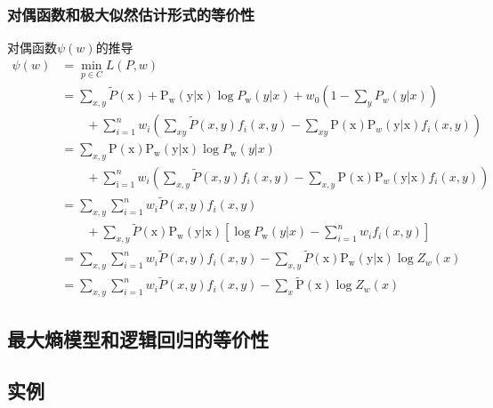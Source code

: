     \subsubsection{对偶函数和极大似然估计形式的等价性}
    对偶函数$\psi(w)$的推导%
    \begin{equation}
        \begin{aligned}
            \psi(w)&=\min _{p \in C} L(P, w) \\
            &=\sum_{x, y} \tilde{P}(\mathrm{x})+ \mathrm{P}_{\mathrm{w}}(\mathrm{y} | \mathrm{x}) \log P_{\mathrm{w}}(y | x)+w_{0}\left(1-\sum_{y} P_{w}(y | x)\right)\\
                &\qquad +\sum_{i=1}^{n} w_{i}\left(\sum_{x y} \tilde{P}(x, y) f_{i}(x, y)-\sum_{x y} \mathrm{P}(\mathrm{x}) \mathrm{P}_{w}(\mathrm{y} | \mathrm{x}) f_{i}(x, y)\right)\\
            &=\sum_{x, y} \mathrm{P}(\mathrm{x}) \mathrm{P}_{\mathrm{w}}(\mathrm{y} | \mathrm{x}) \log P_{\mathrm{w}}(y | x)\\
                &\qquad +\sum_{\mathrm{i}=1}^{n} w_{i}\left(\sum_{x, y} \tilde{P}(x, y) f_{i}(x, y)-\sum_{x, y} \mathrm{P}(\mathrm{x}) \mathrm{P}_{w}(\mathrm{y} | \mathrm{x}) f_{i}(x, y)\right)\\
            &=\sum_{x, y} \sum_{i=1}^{n} w_{i} \tilde{P}(x, y) f_{i}(x, y)\\
                &\qquad +\sum_{x, y} \tilde{P}(\mathrm{x}) \mathrm{P}_{\mathrm{w}}(\mathrm{y} | \mathrm{x})\left[\log P_{\mathrm{w}}(y | x)-\sum_{i=1}^{n} w_{i} f_{i}(x, y)\right]\\
            &=\sum_{x, y} \sum_{i=1}^{n} w_{i} \tilde{P}(x, y) f_{i}(x, y)-\sum_{x, y} \tilde{P}(\mathrm{x}) \mathrm{P}_{\mathrm{w}}(\mathrm{y} | \mathrm{x}) \log Z_{w}(x)\\
            &=\sum_{x, y} \sum_{i=1}^{n} w_{i} \tilde{P}(x, y) f_{i}(x, y)-\sum_{x} \tilde{\mathrm{P}}(\mathrm{x}) \log Z_{w}(x)
        \end{aligned}
    \end{equation}
    
    \subsection{最大熵模型和逻辑回归的等价性}
    \subsection{实例}
    
